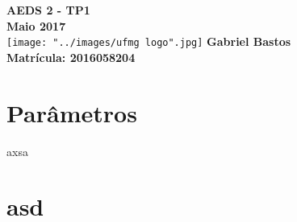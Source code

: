 \documentclass{report}
\begin{document}
\begin{titlepage}
    \centering
    \vfill
    {\bfseries\Large
        AEDS 2 - TP1\\
        Maio 2017\\
    }    
    \vfill
    \texttt{[image: "../images/ufmg logo".jpg]}
    \vfill
    {\bfseries\Large
      Gabriel Bastos\\[5pt]
      Matr\'icula: 2016058204
    }
    \vfill
\end{titlepage}


\section{Par\^ametros}
axsa
\section{asd}
\end{document}
